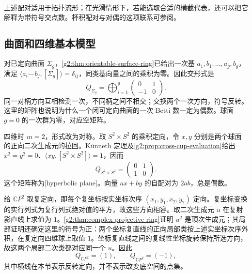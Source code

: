 上述配对适用于拓扑流形；在光滑情形下，若能选取合适的横截代表，还可以把它解释为带符号交点数。杯积配对与对偶的这项联系可参阅\cite[第3.3节，Poincaré Duality]{Hatcher2002}。

\subsection{曲面和四维基本模型}
\label{g2:subsec:0605:02}
对已定向曲面 \(\Sigma_g\)，\cref{g2:thm:orientable-surface-ring}已给出一次基 \(a_1,b_1,\ldots,a_g,b_g\)，满足 \(\langle a_i\smile b_j,[\Sigma_g]\rangle=\delta_{ij}\)，同类基向量之间的乘积为零。因此交形式是
\begin{equation}\label{g2:eq:surface-symplectic-form}
	Q_{\Sigma_g}=\bigoplus_{i=1}^g
	\begin{pmatrix}0&1\\-1&0\end{pmatrix}.
\end{equation}
同一对柄方向互相检测一次，不同柄之间不相交；交换两个一次方向，符号反转。这里的矩阵也说明为什么一个闭可定向曲面的一次 Betti 数一定为偶数。球面 \(g=0\) 的一次群为零，对应空矩阵。

\ProseParagraphBreak

四维时 \(m=2\)，形式改为对称。取 \(S^2\times S^2\) 的乘积定向，令 \(x,y\) 分别是两个球面的正向二次生成元的拉回。Künneth 定理及\cref{g2:prop:cross-cup-evaluation}给出 \(x^2=y^2=0\)、\(\langle xy,[S^2\times S^2]\rangle=1\)，因而
\[
	Q_{S^2\times S^2}=\begin{pmatrix}0&1\\1&0\end{pmatrix}.
\]
这个矩阵称为[hyperbolic plane]。向量 \(ax+by\) 的自配对为 \(2ab\)，总是偶数。

\ProseParagraphBreak

给 \(\mathbb CP^2\) 取复定向，即每个复坐标按实坐标次序 \((x_1,y_1,x_2,y_2)\) 定向。复坐标变换的实行列式为复行列式绝对值的平方，故这些方向相容。取二次生成元 \(u\) 在复射影直线上求值为 \(1\)。\cref{g2:thm:complex-projective-ring}证明 \(u^2\) 是顶次生成元；其局部证明还确定这里的符号为正：两个坐标复直线的正向局部类按上述实坐标次序外积，在复定向四维球上取值 \(1\)。坐标复直线之间的复线性坐标旋转保持所选方向，故这两个局部二次类都对应同一个 \(u\)。因此
\[
	Q_{\mathbb CP^2}=(1),\qquad Q_{\overline{\mathbb CP^2}}=(-1),
\]
其中横线在本节表示反转定向，并不表示改变底空间的点集。


